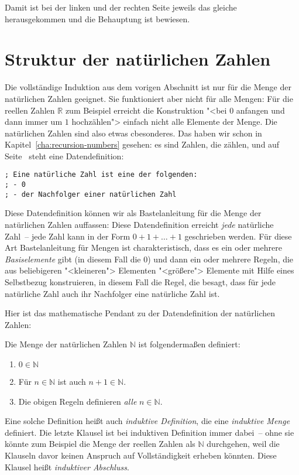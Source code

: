 Damit ist bei der linken und der rechten Seite jeweils das gleiche
herausgekommen und die Behauptung ist bewiesen.

\section{Struktur der natürlichen Zahlen}

Die vollständige Induktion aus dem vorigen Abschnitt ist nur für die
Menge der natürlichen Zahlen geeignet.  Sie funktioniert aber nicht für alle
Mengen: Für die reellen Zahlen $\mathbb{R}$ zum Beispiel erreicht die
Konstruktion "<bei $0$ anfangen und dann immer um $1$ hochzählen"> einfach
nicht alle Elemente der Menge.%
Die
natürlichen Zahlen sind also etwas cbesonderes.  Das haben wir schon in
Kapitel~\ref{cha:recursion-numbers} gesehen: es sind Zahlen, die zählen,
und auf Seite~\pageref{page:datendefinition-N} steht eine
Datendefinition:
%
\begin{lstlisting}
; Eine natürliche Zahl ist eine der folgenden:
; - 0
; - der Nachfolger einer natürlichen Zahl
\end{lstlisting}
%
Diese Datendefinition können wir als Bastelanleitung für die Menge der
natürlichen Zahlen auffassen:
Diese Datendefinition erreicht \emph{jede} natürliche Zahl~-- jede Zahl kann
in der Form $0+1+\ldots+1$ geschrieben werden.  Für diese Art
Bastelanleitung für Mengen ist charakteristisch, dass es ein oder
mehrere \textit{Basiselemente} gibt (in diesem
Fall die $0$) und dann ein oder mehrere Regeln, die aus beliebigeren
"<kleineren"> Elementen "<größere"> Elemente mit Hilfe eines Selbstbezug konstruieren, in diesem
Fall die Regel, die besagt, dass für jede natürliche Zahl auch ihr
Nachfolger eine natürliche Zahl ist.

Hier ist das mathematische Pendant zu der Datendefinition der natürlichen
Zahlen:
%
\begin{definition}
  \label{def:N}
  Die Menge der natürlichen Zahlen $\mathbb{N}$ ist folgendermaßen definiert:
  \begin{enumerate}
  \item $0\in\mathbb{N}$
  \item Für $n\in\mathbb{N}$ ist auch $n+1\in\mathbb{N}$.
  \item Die obigen Regeln definieren \emph{alle} $n\in\mathbb{N}$.
  \end{enumerate}
\end{definition}
% 
Eine solche Definition heißt auch \textit{induktive
  Definition}, die eine \textit{induktive
  Menge} definiert.  Die letzte Klausel ist bei
induktiven Definition immer dabei~--
ohne sie könnte zum Beispiel die Menge der reellen
Zahlen als $\mathbb{N}$ durchgehen, weil die Klauseln davor 
keinen Anspruch auf Vollständigkeit erheben könnten.  Diese Klausel
heißt \textit{induktiver Abschluss}.

